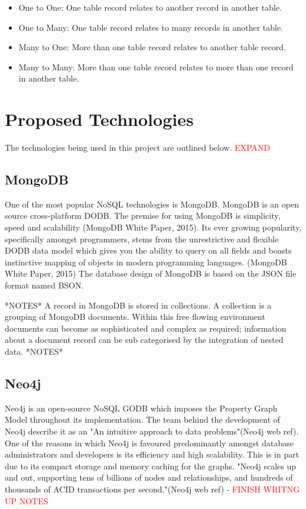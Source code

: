 \begin{itemize}
\item One to One: One table record relates to another record in another table.
\item One to Many: One table record relates to many records in another table.
\item Many to One: More than one table record relates to another table record.
\item Many to Many: More than one table record relates to more than one record in another table.
\end{itemize}
\section{Proposed Technologies}
The technologies being used in this project are outlined below. \textcolor{red}{EXPAND}
\subsection{MongoDB}\label{mongo}
One of the most popular NoSQL technologies is MongoDB. MongoDB is an open source cross-platform DODB. The premise for using MongoDB is simplicity, speed and scalability (MongoDB White Paper, 2015). Its ever growing popularity, specifically amongst programmers, stems from the unrestrictive and flexible DODB data model which gives you the ability to query on all fields and boasts instinctive mapping of objects in modern programming languages. (MongoDB White Paper, 2015) The database design of MongoDB is based on the JSON file format named BSON.

*NOTES* A record in MongoDB is stored in collections. A collection is a grouping of MongoDB documents.
Within this free flowing environment documents can become as sophisticated and complex as required; information about a document record can be sub categorised by the integration of nested data. *NOTES*

\subsection{Neo4j}\label{neo}
Neo4j is an open-source NoSQL GODB which imposes the Property Graph Model throughout its implementation. The team behind the development of Neo4j describe it as an "An intuitive approach to data problems"(Neo4j web ref). One of the reasons in which Neo4j is favoured predominantly amongst database administrators and developers is its efficiency and high scalability. This is in part due to its compact storage and memory caching for the graphs. "Neo4j scales up and out, supporting tens of billions of nodes and relationships, and hundreds of thousands of ACID transactions per second."(Neo4j web ref) -\textcolor{red}{ FINISH WRITNG UP NOTES}

